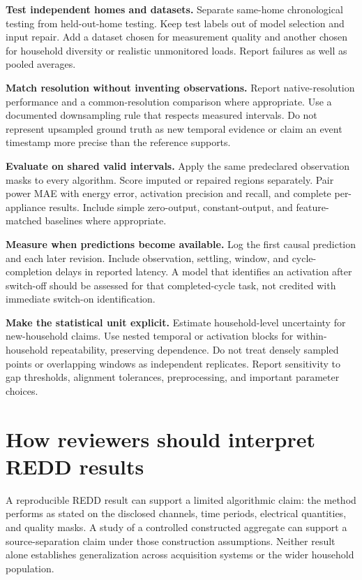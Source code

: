 \documentclass[11pt,letterpaper]{article}
\begin{document}
\textbf{Test independent homes and datasets.} Separate same-home chronological testing from held-out-home testing. Keep test labels out of model selection and input repair. Add a dataset chosen for measurement quality and another chosen for household diversity or realistic unmonitored loads. Report failures as well as pooled averages.

\textbf{Match resolution without inventing observations.} Report native-resolution performance and a common-resolution comparison where appropriate. Use a documented downsampling rule that respects measured intervals. Do not represent upsampled ground truth as new temporal evidence or claim an event timestamp more precise than the reference supports.

\textbf{Evaluate on shared valid intervals.} Apply the same predeclared observation masks to every algorithm. Score imputed or repaired regions separately. Pair power MAE with energy error, activation precision and recall, and complete per-appliance results. Include simple zero-output, constant-output, and feature-matched baselines where appropriate.

\textbf{Measure when predictions become available.} Log the first causal prediction and each later revision. Include observation, settling, window, and cycle-completion delays in reported latency. A model that identifies an activation after switch-off should be assessed for that completed-cycle task, not credited with immediate switch-on identification.

\textbf{Make the statistical unit explicit.} Estimate household-level uncertainty for new-household claims. Use nested temporal or activation blocks for within-household repeatability, preserving dependence. Do not treat densely sampled points or overlapping windows as independent replicates. Report sensitivity to gap thresholds, alignment tolerances, preprocessing, and important parameter choices.

\section{How reviewers should interpret REDD results}
A reproducible REDD result can support a limited algorithmic claim: the method performs as stated on the disclosed channels, time periods, electrical quantities, and quality masks. A study of a controlled constructed aggregate can support a source-separation claim under those construction assumptions. Neither result alone establishes generalization across acquisition systems or the wider household population.
\end{document}
